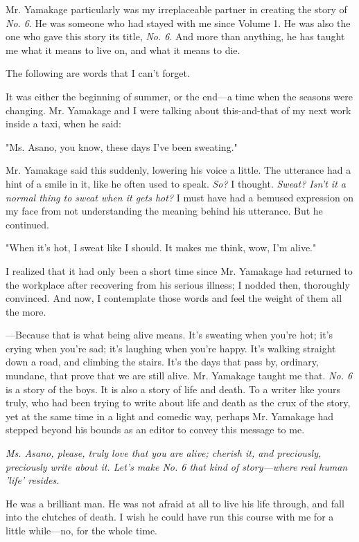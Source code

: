 Mr. Yamakage particularly was my irreplaceable partner in creating the
story of \emph{No. 6}. He was someone who had stayed with me since Volume 1. He
was also the one who gave this story its title, \emph{No. 6}. And more than
anything, he has taught me what it means to live on, and what it means
to die.

The following are words that I can't forget.

It was either the beginning of summer, or the end---a time when the
seasons were changing. Mr. Yamakage and I were talking about
this-and-that of my next work inside a taxi, when he said:

"Ms. Asano, you know, these days I've been sweating."

Mr. Yamakage said this suddenly, lowering his voice a little. The
utterance had a hint of a smile in it, like he often used to speak. \emph{So?}
I thought. \emph{Sweat? Isn't it a normal thing to sweat when it gets hot?} I
must have had a bemused expression on my face from not understanding the
meaning behind his utterance. But he continued.

"When it's hot, I sweat like I should. It makes me think, wow, I'm
alive."

I realized that it had only been a short time since Mr. Yamakage had
returned to the workplace after recovering from his serious illness; I
nodded then, thoroughly convinced. And now, I contemplate those words
and feel the weight of them all the more.

---Because that is what being alive means. It's sweating when you're hot;
it's crying when you're sad; it's laughing when you're happy. It's
walking straight down a road, and climbing the stairs. It's the days
that pass by, ordinary, mundane, that prove that we are still alive. Mr.
Yamakage taught me that. \emph{No. 6} is a story of the boys. It is also a
story of life and death. To a writer like yours truly, who had been
trying to write about life and death as the crux of the story, yet at
the same time in a light and comedic way, perhaps Mr. Yamakage had
stepped beyond his bounds as an editor to convey this message to me.

\emph{Ms. Asano, please, truly love that you are alive; cherish it, and
preciously, preciously write about it. Let's make \emph{No. 6} that kind of
story---where real human 'life' resides.}

He was a brilliant man. He was not afraid at all to live his life
through, and fall into the clutches of death. I wish he could have run
this course with me for a little while---no, for the whole time.

